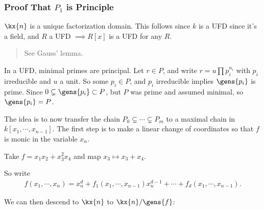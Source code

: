 \hypertarget{proof-that-p_1-is-principle}{%
\subsubsection{\texorpdfstring{Proof That \(P_1\) is
Principle}{Proof That P\_1 is Principle}}\label{proof-that-p_1-is-principle}}

\begin{claim}

\(\kx{n}\) is a unique factorization domain. This follows since \(k\) is
a UFD since it's a field, and \(R\) a UFD \(\implies R[x]\) is a UFD for
any \(R\).

\begin{quote}
See Gauss' lemma.
\end{quote}

\end{claim}

\begin{claim}

In a UFD, minimal primes are principal. Let \(r \in P\), and write
\(r = u \prod p_i^{n_i}\) with \(p_i\) irreducible and \(u\) a unit. So
some \(p_i\in P\), and \(p_i\) irreducible implies \(\gens{p_i}\) is
prime. Since \(0 \subsetneq \gens{p_i} \subset P\), but \(P\) was prime
and assumed minimal, so \(\gens{p_i} = P\).

\end{claim}

The idea is to now transfer the chain
\(P_0 \subsetneq \cdots \subsetneq P_m\) to a maximal chain in
\(k[x_1, \cdots, x_{n-1}]\). The first step is to make a linear change
of coordinates so that \(f\) is monic in the variable \(x_n\).

\begin{example}

Take \(f=x_1x_2 + x_3^2 x_4\) and map \(x_3 \mapsto x_3 + x_4\).

\end{example}

So write
\begin{align*}  
f(x_1, \cdots, x_n) = x_n^d + f_1(x_1, \cdots, x_{n-1}) x_n^{d-1} + \cdots + f_d(x_1, \cdots, x_{n-1})
.\end{align*}

We can then descend to \(\kx{n}\) to \(\kx{n}/\gens{f}\):

\begin{center}
\end{center}

